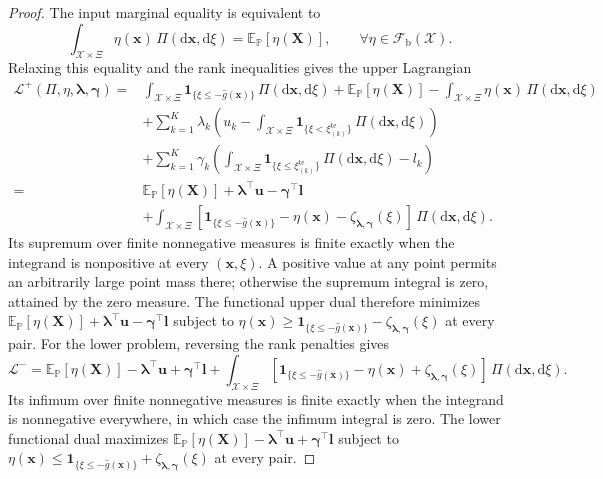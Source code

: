 \begin{proof}
  The input marginal equality is equivalent to
  \[
    \int_{\mathcal X\times\Xi}\eta(\bm x)\,\Pi(\mathrm d\bm x,\mathrm d\xi)
      =\mathbb E_{\mathbb P}\left[\eta(\bm X)\right],
    \qquad\forall\eta\in\mathcal F_{\mathrm b}(\mathcal X).
  \]
  Relaxing this equality and the rank inequalities gives the upper Lagrangian \citep[Section~5.1]{B.V04}
  \[
    \begin{aligned}
      \mathcal L^+(\Pi,\eta,\bm\lambda,\bm\gamma)
      ={}&\int_{\mathcal X\times\Xi}\mathbf1_{\{\xi\le-\hat g(\bm x)\}}\,\Pi(\mathrm d\bm x,\mathrm d\xi)
        +\mathbb E_{\mathbb P}\left[\eta(\bm X)\right]
        -\int_{\mathcal X\times\Xi}\eta(\bm x)\,\Pi(\mathrm d\bm x,\mathrm d\xi)\\
      &+\sum_{k=1}^{K}\lambda_k\left(u_k-\int_{\mathcal X\times\Xi}
          \mathbf1_{\{\xi<\xi_{(k)}^{\mathrm{te}}\}}\,\Pi(\mathrm d\bm x,\mathrm d\xi)\right)\\
      &+\sum_{k=1}^{K}\gamma_k\left(\int_{\mathcal X\times\Xi}
          \mathbf1_{\{\xi\le\xi_{(k)}^{\mathrm{te}}\}}\,\Pi(\mathrm d\bm x,\mathrm d\xi)-l_k\right)\\
      ={}&\mathbb E_{\mathbb P}\left[\eta(\bm X)\right]
        +\bm\lambda^\top\bm u-\bm\gamma^\top\bm l\\
      &+\int_{\mathcal X\times\Xi}\left[
          \mathbf1_{\{\xi\le-\hat g(\bm x)\}}-\eta(\bm x)-\zeta_{\bm\lambda,\bm\gamma}(\xi)
        \right]\,\Pi(\mathrm d\bm x,\mathrm d\xi).
    \end{aligned}
  \]
  Its supremum over finite nonnegative measures is finite exactly when the integrand is nonpositive at every $(\bm x,\xi)$. A positive value at any point permits an arbitrarily large point mass there; otherwise the supremum integral is zero, attained by the zero measure. The functional upper dual therefore minimizes $\mathbb E_{\mathbb P}[\eta(\bm X)]+\bm\lambda^\top\bm u-\bm\gamma^\top\bm l$ subject to $\eta(\bm x)\ge\mathbf1_{\{\xi\le-\hat g(\bm x)\}}-\zeta_{\bm\lambda,\bm\gamma}(\xi)$ at every pair. For the lower problem, reversing the rank penalties gives
  \[
    \mathcal L^-
      =\mathbb E_{\mathbb P}\left[\eta(\bm X)\right]
        -\bm\lambda^\top\bm u+\bm\gamma^\top\bm l
        +\int_{\mathcal X\times\Xi}\left[
          \mathbf1_{\{\xi\le-\hat g(\bm x)\}}-\eta(\bm x)+\zeta_{\bm\lambda,\bm\gamma}(\xi)
        \right]\,\Pi(\mathrm d\bm x,\mathrm d\xi).
  \]
  Its infimum over finite nonnegative measures is finite exactly when the integrand is nonnegative everywhere, in which case the infimum integral is zero. The lower functional dual maximizes $\mathbb E_{\mathbb P}[\eta(\bm X)]-\bm\lambda^\top\bm u+\bm\gamma^\top\bm l$ subject to $\eta(\bm x)\le\mathbf1_{\{\xi\le-\hat g(\bm x)\}}+\zeta_{\bm\lambda,\bm\gamma}(\xi)$ at every pair.


\end{proof}
